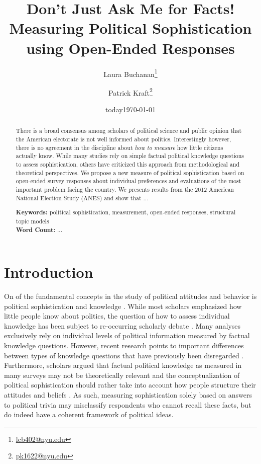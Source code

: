 \documentclass[12pt]{article}
\author{Laura Buchanan\footnote{\href{mailto:lcb402@nyu.edu}{lcb402@nyu.edu}} \and Patrick Kraft\footnote{\href{mailto:pk1622@nyu.edu}{pk1622@nyu.edu}}}
\date{today}
\title{Don't Just Ask Me for Facts!\\
\large{Measuring Political Sophistication using Open-Ended Responses}}
\date{\today}
\begin{document}
\maketitle\doublespacing\thispagestyle{empty}

\begin{abstract}
There is a broad consensus among scholars of political science and public opinion that the American electorate is not well informed about politics. Interestingly however, there is no agreement in the discipline about \textit{how to measure} how little citizens actually know. While many studies rely on simple factual political knowledge questions to assess sophistication, others have criticized this approach from methodological and theoretical perspectives. We propose a new measure of political sophistication based on open-ended survey responses about individual preferences and evaluations of the most important problem facing the country. We presents results from the 2012 American National Election Study (ANES) and show that ...

\vspace{\baselineskip}
\noindent \textbf{Keywords:} political sophistication, measurement, open-ended responses, structural topic models \\

\noindent \textbf{Word Count:} ...
\end{abstract}
\newpage\setcounter{page}{1}



\section{Introduction}

On of the fundamental concepts in the study of political attitudes and behavior is political sophistication and knowledge \citep{converse1964nature,carpini1996americans}. While most scholars emphasized how little people know about politics, the question of how to assess individual knowledge has been subject to re-occurring scholarly debate \citep[e.g.][]{mondak2000reconsidering,mondak2001asked,sturgis2008experiment,debell2013harder,pietryka2013analysis}. Many analyses exclusively rely on individual levels of political information measured by factual knowledge questions. However, recent research points to important differences between types of knowledge questions that have previously been disregarded \citep{barabas2014question}. Furthermore, scholars argued that factual political knowledge as measured in many surveys may not be theoretically relevant \citep{lupia2006elitism} and the conceptualization of political sophistication should rather take into account how people structure their attitudes and beliefs \citep[e.g.][]{luskin1987measuring}. As such, measuring sophistication solely based on answers to political trivia may misclassify respondents who cannot recall these facts, but do indeed have a coherent framework of political ideas.
\end{document}
